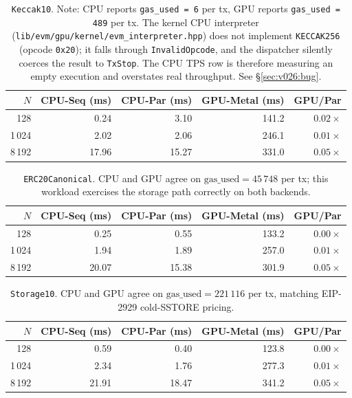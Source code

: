 \begin{table}[h]
\centering
\small
\begin{tabular}{rrrrr}
\toprule
$N$ & CPU-Seq (ms) & CPU-Par (ms) & GPU-Metal (ms) & GPU/Par \\
\midrule
128    & 0.24  & 3.10  & 141.2 & $0.02\times$ \\
1\,024 & 2.02  & 2.06  & 246.1 & $0.01\times$ \\
8\,192 & 17.96 & 15.27 & 331.0 & $0.05\times$ \\
\bottomrule
\end{tabular}
\caption{\texttt{Keccak10}. Note: CPU reports \texttt{gas\_used = 6}
per tx, GPU reports \texttt{gas\_used = 489} per tx. The kernel CPU
interpreter (\texttt{lib/evm/gpu/kernel/evm\_interpreter.hpp}) does not
implement \texttt{KECCAK256} (opcode \texttt{0x20}); it falls through
\texttt{InvalidOpcode}, and the dispatcher silently coerces the result
to \texttt{TxStop}. The CPU TPS row is therefore measuring an empty
execution and overstates real throughput. See \S\ref{sec:v026:bug}.}
\label{tab:v026-keccak}
\end{table}

\begin{table}[h]
\centering
\small
\begin{tabular}{rrrrr}
\toprule
$N$ & CPU-Seq (ms) & CPU-Par (ms) & GPU-Metal (ms) & GPU/Par \\
\midrule
128    & 0.25  & 0.55  & 133.2 & $0.00\times$ \\
1\,024 & 1.94  & 1.89  & 257.0 & $0.01\times$ \\
8\,192 & 20.07 & 15.38 & 301.9 & $0.05\times$ \\
\bottomrule
\end{tabular}
\caption{\texttt{ERC20Canonical}. CPU and GPU agree on
$\text{gas\_used} = 45\,748$ per tx; this workload exercises the
storage path correctly on both backends.}
\label{tab:v026-erc20}
\end{table}

\begin{table}[h]
\centering
\small
\begin{tabular}{rrrrr}
\toprule
$N$ & CPU-Seq (ms) & CPU-Par (ms) & GPU-Metal (ms) & GPU/Par \\
\midrule
128    & 0.59  & 0.40  & 123.8 & $0.00\times$ \\
1\,024 & 2.34  & 1.76  & 277.3 & $0.01\times$ \\
8\,192 & 21.91 & 18.47 & 341.2 & $0.05\times$ \\
\bottomrule
\end{tabular}
\caption{\texttt{Storage10}. CPU and GPU agree on
$\text{gas\_used} = 221\,116$ per tx, matching EIP-2929 cold-SSTORE
pricing.}
\label{tab:v026-storage}
\end{table}

